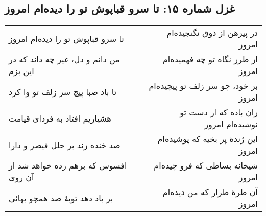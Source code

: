 \begin{center}
\section*{غزل شماره ۱۵: تا سرو قباپوش تو را دیده‌ام امروز}
\label{sec:015}
\begin{longtable}{l p{0.5cm} r}
تا سرو قباپوش تو را دیده‌ام امروز
&&
در پیرهن از ذوق نگنجیده‌ام امروز
\\
من دانم و دل، غیر چه داند که در این بزم
&&
از طرز نگاه تو چه فهمیده‌ام امروز
\\
تا باد صبا پیچ سر زلف تو وا کرد
&&
بر خود، چو سر زلف تو پیچیده‌ام امروز
\\
هشیاریم افتاد به فردای قیامت
&&
زان باده که از دست تو نوشیده‌ام امروز
\\
صد خنده زند بر حلل قیصر و دارا
&&
این ژندهٔ پر بخیه که پوشیده‌ام امروز
\\
افسوس که برهم زده خواهد شد از آن روی
&&
شیخانه بساطی که فرو چیده‌ام امروز
\\
بر باد دهد توبهٔ صد همچو بهائی
&&
آن طرهٔ طرار که من دیده‌ام امروز
\\
\end{longtable}
\end{center}
